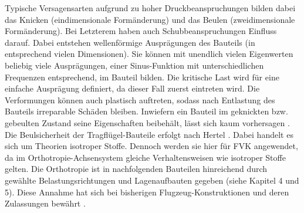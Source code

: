 \noindent Typische Versagensarten aufgrund zu hoher Druckbeanspruchungen bilden dabei das Knicken (eindimensionale Formänderung) und das Beulen (zweidimensionale Formänderung). Bei Letzterem haben auch Schubbeanspruchungen Einfluss darauf. Dabei entstehen wellenförmige Ausprägungen des Bauteils (in entsprechend vielen Dimensionen). Sie können mit unendlich vielen Eigenwerten beliebig viele Ausprägungen, einer Sinus-Funktion mit unterschiedlichen Frequenzen entsprechend, im Bauteil bilden. Die kritische Last wird für eine einfache Ausprägung definiert, da dieser Fall zuerst eintreten wird. Die Verformungen können auch plastisch auftreten, sodass nach Entlastung des Bauteils irreparable Schäden bleiben. Inwiefern ein Bauteil im geknickten bzw. gebeulten Zustand seine Eigenschaften beibehält, lässt sich kaum vorhersagen \cite{item16}.\\

\noindent Die Beulsicherheit der Tragflügel-Bauteile erfolgt nach Hertel \cite{item1}. Dabei handelt es sich um Theorien isotroper Stoffe. Dennoch werden sie hier für FVK angewendet, da im Orthotropie-Achsensystem gleiche Verhaltensweisen wie isotroper Stoffe gelten. Die Orthotropie ist in nachfolgenden Bauteilen hinreichend durch gewählte Belastungsrichtungen und Lagenaufbauten gegeben (siehe Kapitel 4 und 5). Diese Annahme hat sich bei bisherigen Flugzeug-Konstruktionen und deren Zulassungen bewährt \cite{item21}.\\

